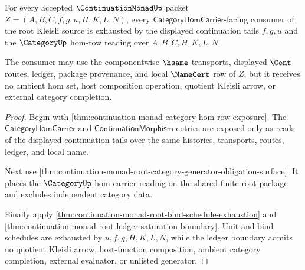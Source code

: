 \begin{theorem}
\label{thm:continuation-monad-root-category-hom-consumer-totality}
For every accepted $\ContinuationMonadUp$ packet $Z=(A,B,C,f,g,u,H,K,L,N)$, every $\mathsf{CategoryHomCarrier}$-facing consumer of the root Kleisli source is exhausted by the displayed continuation tails $f,g,u$ and the $\CategoryUp$ hom-row reading over $A,B,C,H,K,L,N$.

The consumer may use the componentwise $\hsame$ transports, displayed $\Cont$ routes, ledger, package provenance, and local $\NameCert$ row of $Z$, but it receives no ambient hom set, host composition operation, quotient Kleisli arrow, or external category completion.
\end{theorem}
\begin{proof}
Begin with \autoref{thm:continuation-monad-category-hom-row-exposure}. The $\mathsf{CategoryHomCarrier}$ and $\mathsf{ContinuationMorphism}$ entries are exposed only as reads of the displayed continuation tails over the same histories, transports, routes, ledger, and local name.

Next use \autoref{thm:continuation-monad-root-category-generator-obligation-surface}. It places the $\CategoryUp$ hom-carrier reading on the shared finite root package and excludes independent category data.

Finally apply \autoref{thm:continuation-monad-root-bind-schedule-exhaustion} and \autoref{thm:continuation-monad-root-ledger-saturation-boundary}. Unit and bind schedules are exhausted by $u,f,g,H,K,L,N$, while the ledger boundary admits no quotient Kleisli arrow, host-function composition, ambient category completion, external evaluator, or unlisted generator.
\end{proof}

